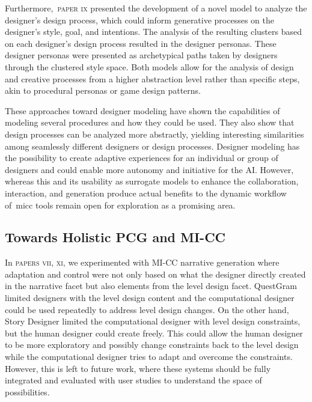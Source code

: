 


Furthermore,~\textsc{paper ix} presented the development of a novel model to analyze the designer's design process, which could inform generative processes on the designer's style, goal, and intentions. The analysis of the resulting clusters based on each designer's design process resulted in the designer personas. These designer personas were presented as archetypical paths taken by designers through the clustered style space. Both models allow for the analysis of design and creative processes from a higher abstraction level rather than specific steps, akin to procedural personas or game design patterns. 

These approaches toward designer modeling have shown the capabilities of modeling several procedures and how they could be used. They also show that design processes can be analyzed more abstractly, yielding interesting similarities among seamlessly different designers or design processes. Designer modeling has the possibility to create adaptive experiences for an individual or group of designers and could enable more autonomy and initiative for the AI. However, whereas this and its usability as surrogate models to enhance the collaboration, interaction, and generation produce actual benefits to the dynamic workflow of~\acrshort{micc} tools remain open for exploration as a promising area.

\subsection{Towards Holistic PCG and MI-CC}

In \textsc{papers vii, xi}, we experimented with MI-CC narrative generation where adaptation and control were not only based on what the designer directly created in the narrative facet but also elements from the level design facet. QuestGram limited designers with the level design content and the computational designer could be used repeatedly to address level design changes. On the other hand, Story Designer limited the computational designer with level design constraints, but the human designer could create freely. This could allow the human designer to be more exploratory and possibly change constraints back to the level design while the computational designer tries to adapt and overcome the constraints. However, this is left to future work, where these systems should be fully integrated and evaluated with user studies to understand the space of possibilities.

